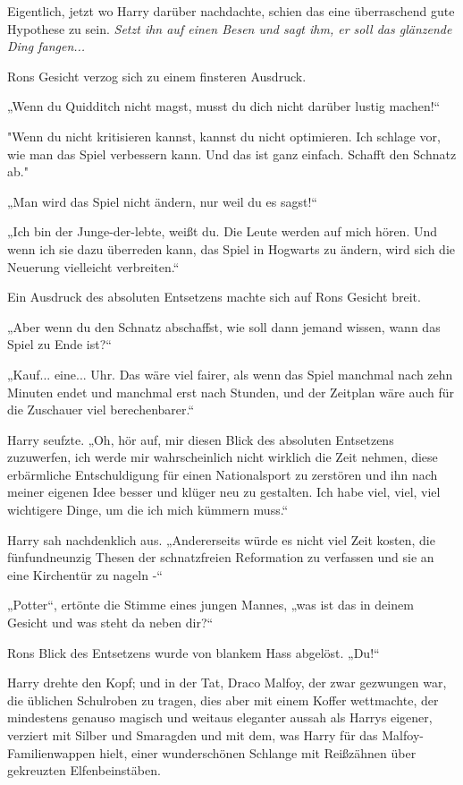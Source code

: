 {Eigentlich, jetzt wo Harry darüber nachdachte, schien das eine überraschend gute Hypothese zu sein. \emph{Setzt ihn auf einen Besen und sagt ihm, er soll das glänzende Ding fangen...}

Rons Gesicht verzog sich zu einem finsteren Ausdruck.

„Wenn du Quidditch nicht magst, musst du dich nicht darüber lustig machen!“

"Wenn du nicht kritisieren kannst, kannst du nicht optimieren. Ich schlage vor, wie man das Spiel verbessern kann. Und das ist ganz einfach. Schafft den Schnatz ab."

„Man wird das Spiel nicht ändern, nur weil du es sagst!“

„Ich bin der Junge-der-lebte, weißt du. Die Leute werden auf mich hören. Und wenn ich sie dazu überreden kann, das Spiel in Hogwarts zu ändern, wird sich die Neuerung vielleicht verbreiten.“

Ein Ausdruck des absoluten Entsetzens machte sich auf Rons Gesicht breit.

„Aber wenn du den Schnatz abschaffst, wie soll dann jemand wissen, wann das Spiel zu Ende ist?“

„Kauf... eine... Uhr. Das wäre viel fairer, als wenn das Spiel manchmal nach zehn Minuten endet und manchmal erst nach Stunden, und der Zeitplan wäre auch für die Zuschauer viel berechenbarer.“

Harry seufzte. „Oh, hör auf, mir diesen Blick des absoluten Entsetzens zuzuwerfen, ich werde mir wahrscheinlich nicht wirklich die Zeit nehmen, diese erbärmliche Entschuldigung für einen Nationalsport zu zerstören und ihn nach meiner eigenen Idee besser und klüger neu zu gestalten. Ich habe viel, viel, viel wichtigere Dinge, um die ich mich kümmern muss.“

Harry sah nachdenklich aus. „Andererseits würde es nicht viel Zeit kosten, die fünfundneunzig Thesen der schnatzfreien Reformation zu verfassen und sie an eine Kirchentür zu nageln -“

„Potter“, ertönte die Stimme eines jungen Mannes, „was ist das in deinem Gesicht und was steht da neben dir?“

Rons Blick des Entsetzens wurde von blankem Hass abgelöst. „Du!“

Harry drehte den Kopf; und in der Tat, Draco Malfoy, der zwar gezwungen war, die üblichen Schulroben zu tragen, dies aber mit einem Koffer wettmachte, der mindestens genauso magisch und weitaus eleganter aussah als Harrys eigener, verziert mit Silber und Smaragden und mit dem, was Harry für das Malfoy-Familienwappen hielt, einer wunderschönen Schlange mit Reißzähnen über gekreuzten Elfenbeinstäben.

}
